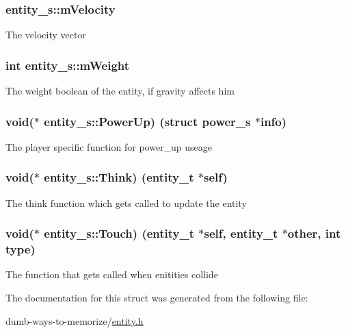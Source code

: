 \subsubsection[{\texorpdfstring{m\+Velocity}{mVelocity}}]{ entity\+\_\+s\+::m\+Velocity}\hypertarget{structentity__s_a8ecee66d9b0c7eeedac38e63d5f9128d}{}\label{structentity__s_a8ecee66d9b0c7eeedac38e63d5f9128d}
The velocity vector 
\subsubsection[{\texorpdfstring{m\+Weight}{mWeight}}]{\setlength{\rightskip}{0pt plus 5cm}int entity\+\_\+s\+::m\+Weight}\hypertarget{structentity__s_ac2067b7ab37cc1f70d5e8353755109fa}{}\label{structentity__s_ac2067b7ab37cc1f70d5e8353755109fa}
The weight boolean of the entity, if gravity affects him 
\subsubsection[{\texorpdfstring{Power\+Up}{PowerUp}}]{\setlength{\rightskip}{0pt plus 5cm}void($\ast$ entity\+\_\+s\+::\+Power\+Up) (struct {\bf power\+\_\+s} $\ast$info)}\hypertarget{structentity__s_a63100d631194bc2bec59589abd2521b6}{}\label{structentity__s_a63100d631194bc2bec59589abd2521b6}
The player specific function for power\+\_\+up useage 
\subsubsection[{\texorpdfstring{Think}{Think}}]{\setlength{\rightskip}{0pt plus 5cm}void($\ast$ entity\+\_\+s\+::\+Think) ({\bf entity\+\_\+t} $\ast$self)}\hypertarget{structentity__s_a801b3cd53659d72d15b0d9582ba344c8}{}\label{structentity__s_a801b3cd53659d72d15b0d9582ba344c8}
The think function which gets called to update the entity 
\subsubsection[{\texorpdfstring{Touch}{Touch}}]{\setlength{\rightskip}{0pt plus 5cm}void($\ast$ entity\+\_\+s\+::\+Touch) ({\bf entity\+\_\+t} $\ast$self, {\bf entity\+\_\+t} $\ast$other, int type)}\hypertarget{structentity__s_a549f9a204a7d1ed7008cf48725d06fbe}{}\label{structentity__s_a549f9a204a7d1ed7008cf48725d06fbe}
The function that gets called when enitities collide 

The documentation for this struct was generated from the following file\+:\begin{DoxyCompactItemize}
\item 
dumb-\/ways-\/to-\/memorize/\hyperlink{entity_8h}{entity.\+h}\end{DoxyCompactItemize}
